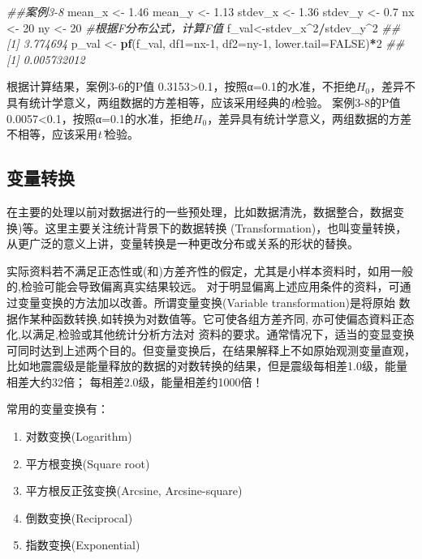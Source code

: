 \documentclass[
]{article}
\newenvironment{Shaded}{\begin{snugshade}}{\end{snugshade}}
\newcommand{\CommentTok}[1]{\textcolor[rgb]{0.56,0.35,0.01}{\textit{#1}}}
\newcommand{\DataTypeTok}[1]{\textcolor[rgb]{0.13,0.29,0.53}{#1}}
\newcommand{\DecValTok}[1]{\textcolor[rgb]{0.00,0.00,0.81}{#1}}
\newcommand{\FloatTok}[1]{\textcolor[rgb]{0.00,0.00,0.81}{#1}}
\newcommand{\KeywordTok}[1]{\textcolor[rgb]{0.13,0.29,0.53}{\textbf{#1}}}
\newcommand{\NormalTok}[1]{#1}
\newcommand{\OperatorTok}[1]{\textcolor[rgb]{0.81,0.36,0.00}{\textbf{#1}}}
\newcommand{\OtherTok}[1]{\textcolor[rgb]{0.56,0.35,0.01}{#1}}
\newcommand{\StringTok}[1]{\textcolor[rgb]{0.31,0.60,0.02}{#1}}
\providecommand{\tightlist}{%
  \setlength{\itemsep}{0pt}\setlength{\parskip}{0pt}}
\begin{document}
\begin{Shaded}
\begin{Highlighting}[]
\CommentTok{##案例3-8}
\NormalTok{mean_x <-}\StringTok{ }\FloatTok{1.46}
\NormalTok{mean_y <-}\StringTok{ }\FloatTok{1.13}
\NormalTok{stdev_x <-}\StringTok{ }\FloatTok{1.36}
\NormalTok{stdev_y <-}\StringTok{ }\FloatTok{0.7}
\NormalTok{nx <-}\StringTok{ }\DecValTok{20}
\NormalTok{ny <-}\StringTok{ }\DecValTok{20}
\CommentTok{#根据F分布公式，计算F值}
\NormalTok{f_val<-stdev_x}\OperatorTok{^}\DecValTok{2}\OperatorTok{/}\NormalTok{stdev_y}\OperatorTok{^}\DecValTok{2}
\CommentTok{## [1] 3.774694}
\NormalTok{p_val <-}\StringTok{ }\KeywordTok{pf}\NormalTok{(f_val, }\DataTypeTok{df1=}\NormalTok{nx}\DecValTok{-1}\NormalTok{, }\DataTypeTok{df2=}\NormalTok{ny}\DecValTok{-1}\NormalTok{, }\DataTypeTok{lower.tail=}\OtherTok{FALSE}\NormalTok{)}\OperatorTok{*}\DecValTok{2}
\CommentTok{## [1] 0.005732012}
\end{Highlighting}
\end{Shaded}

根据计算结果，案例3-6的P值 0.3153\textgreater0.1，按照α=0.1的水准，不拒绝\(H_0\)，差异不具有统计学意义，两组数据的方差相等，应该采用经典的\emph{t}检验。
案例3-8的P值 0.0057\textless0.1，按照α=0.1的水准，拒绝\(H_0\)，差异具有统计学意义，两组数据的方差不相等，应该采用\emph{t'}检验。

\hypertarget{ux53d8ux91cfux8f6cux6362}{%
\subsection{变量转换}\label{ux53d8ux91cfux8f6cux6362}}

在主要的处理以前对数据进行的一些预处理，比如数据清洗，数据整合，数据变换)等。这里主要关注统计背景下的数据转换
(Transformation)，也叫变量转换，从更广泛的意义上讲，变量转换是一种更改分布或关系的形状的替换。

实际资料若不满足正态性或(和)方差齐性的假定，尤其是小样本资料时，如用一般的,检验可能会导致偏离真实结果较远。
对于明显偏离上述应用条件的资料，可通过变量变换的方法加以改善。所谓变量变换(Variable transformation)是将原始
数据作某种函数转换,如转换为对数值等。它可使各组方差齐同, 亦可使偏态資料正态化,以满足,检验或其他统计分析方法对
资料的要求。通常情况下，适当的变显变换可同时达到上述两个目的。但变量变换后，在结果解释上不如原始观测变量直观，
比如地震震级是能量释放的数据的对数转换的结果，但是震级每相差1.0级，能量相差大约32倍；
每相差2.0级，能量相差约1000倍！

常用的变量变换有：

\begin{enumerate}
\def\labelenumi{\arabic{enumi}.}
\tightlist
\item
  对数变换(Logarithm)
\item
  平方根变换(Square root)
\item
  平方根反正弦变换(Arcsine, Arcsine-square)
\item
  倒数变换(Reciprocal)
\item
  指数变换(Exponential)
\end{enumerate}
\end{document}
